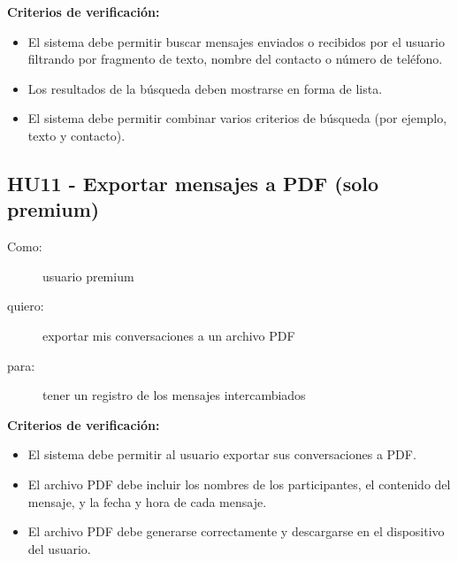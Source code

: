 \textbf{Criterios de verificación:}
\begin{itemize}
    \item El sistema debe permitir buscar mensajes enviados o recibidos por el usuario filtrando por fragmento de texto, nombre del contacto o número de teléfono.
    \item Los resultados de la búsqueda deben mostrarse en forma de lista.
    \item El sistema debe permitir combinar varios criterios de búsqueda (por ejemplo, texto y contacto).
\end{itemize}

\subsection*{HU11 - Exportar mensajes a PDF (solo premium)}
\begin{description}
    \item[Como:] usuario premium
    \item[quiero:] exportar mis conversaciones a un archivo PDF
    \item[para:]tener un registro de los mensajes intercambiados
\end{description}

\textbf{Criterios de verificación:}
\begin{itemize}
    \item El sistema debe permitir al usuario exportar sus conversaciones a PDF.
    \item El archivo PDF debe incluir los nombres de los participantes, el contenido del mensaje, y la fecha y hora de cada mensaje.
    \item El archivo PDF debe generarse correctamente y descargarse en el dispositivo del usuario.
\end{itemize}

\vspace{5ex}